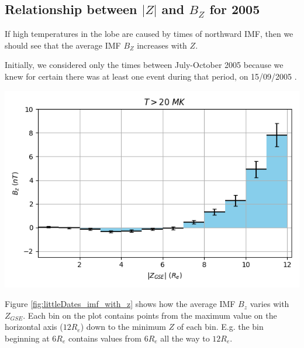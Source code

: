 \documentclass[12pt]{article}
\newenvironment{Figure}
  {\par\medskip\noindent\minipage{\linewidth}}
  {\endminipage\par\medskip}
\begin{document}
\subsection{Relationship between $|Z|$ and $B_Z$ for 2005}
If high temperatures in the lobe are caused by times of northward IMF, then we should see that the average IMF $B_Z$ increases with $Z$. 

Initially, we considered only the times between July-October 2005 because we knew for certain there was at least one event during that period, on 15/09/2005 \cite{Fear1506}.

\begin{Figure}
    \begin{minipage}[c]{0.57\textwidth}
        \centering
        \includegraphics[width=\textwidth]{littleDates_imf_with_z.png}
    \end{minipage}
    \begin{minipage}[c]{0.4\textwidth}
        \label{fig:littleDates_imf_with_z}
    \end{minipage}
\end{Figure}

Figure \ref{fig:littleDates_imf_with_z} shows how the average IMF $B_z$ varies with $Z_{GSE}$. Each bin on the plot contains points from the maximum value on the horizontal axis ($12R_e$) down to the minimum $Z$ of each bin. E.g. the bin beginning at $6R_e$ contains values from $6R_e$ all the way to $12R_e$.
\end{document}
